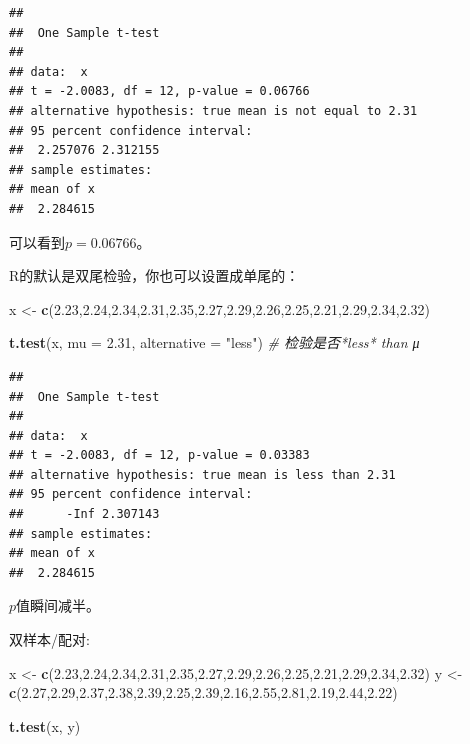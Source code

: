 \documentclass[]{book}
\newenvironment{Shaded}{\begin{snugshade}}{\end{snugshade}}
\newcommand{\CommentTok}[1]{\textcolor[rgb]{0.56,0.35,0.01}{\textit{#1}}}
\newcommand{\DataTypeTok}[1]{\textcolor[rgb]{0.13,0.29,0.53}{#1}}
\newcommand{\FloatTok}[1]{\textcolor[rgb]{0.00,0.00,0.81}{#1}}
\newcommand{\KeywordTok}[1]{\textcolor[rgb]{0.13,0.29,0.53}{\textbf{#1}}}
\newcommand{\NormalTok}[1]{#1}
\newcommand{\StringTok}[1]{\textcolor[rgb]{0.31,0.60,0.02}{#1}}
\begin{document}
\begin{verbatim}
## 
##  One Sample t-test
## 
## data:  x
## t = -2.0083, df = 12, p-value = 0.06766
## alternative hypothesis: true mean is not equal to 2.31
## 95 percent confidence interval:
##  2.257076 2.312155
## sample estimates:
## mean of x 
##  2.284615
\end{verbatim}

可以看到\(p=0.06766\)。

R的默认是双尾检验，你也可以设置成单尾的：

\begin{Shaded}
\begin{Highlighting}[]
\NormalTok{x <-}\StringTok{ }\KeywordTok{c}\NormalTok{(}\FloatTok{2.23}\NormalTok{,}\FloatTok{2.24}\NormalTok{,}\FloatTok{2.34}\NormalTok{,}\FloatTok{2.31}\NormalTok{,}\FloatTok{2.35}\NormalTok{,}\FloatTok{2.27}\NormalTok{,}\FloatTok{2.29}\NormalTok{,}\FloatTok{2.26}\NormalTok{,}\FloatTok{2.25}\NormalTok{,}\FloatTok{2.21}\NormalTok{,}\FloatTok{2.29}\NormalTok{,}\FloatTok{2.34}\NormalTok{,}\FloatTok{2.32}\NormalTok{)}

\KeywordTok{t.test}\NormalTok{(x, }\DataTypeTok{mu =} \FloatTok{2.31}\NormalTok{, }\DataTypeTok{alternative =} \StringTok{"less"}\NormalTok{) }\CommentTok{# 检验是否*less* than μ}
\end{Highlighting}
\end{Shaded}

\begin{verbatim}
## 
##  One Sample t-test
## 
## data:  x
## t = -2.0083, df = 12, p-value = 0.03383
## alternative hypothesis: true mean is less than 2.31
## 95 percent confidence interval:
##      -Inf 2.307143
## sample estimates:
## mean of x 
##  2.284615
\end{verbatim}

\(p\)值瞬间减半。

双样本/配对:

\begin{Shaded}
\begin{Highlighting}[]
\NormalTok{x <-}\StringTok{ }\KeywordTok{c}\NormalTok{(}\FloatTok{2.23}\NormalTok{,}\FloatTok{2.24}\NormalTok{,}\FloatTok{2.34}\NormalTok{,}\FloatTok{2.31}\NormalTok{,}\FloatTok{2.35}\NormalTok{,}\FloatTok{2.27}\NormalTok{,}\FloatTok{2.29}\NormalTok{,}\FloatTok{2.26}\NormalTok{,}\FloatTok{2.25}\NormalTok{,}\FloatTok{2.21}\NormalTok{,}\FloatTok{2.29}\NormalTok{,}\FloatTok{2.34}\NormalTok{,}\FloatTok{2.32}\NormalTok{)}
\NormalTok{y <-}\StringTok{ }\KeywordTok{c}\NormalTok{(}\FloatTok{2.27}\NormalTok{,}\FloatTok{2.29}\NormalTok{,}\FloatTok{2.37}\NormalTok{,}\FloatTok{2.38}\NormalTok{,}\FloatTok{2.39}\NormalTok{,}\FloatTok{2.25}\NormalTok{,}\FloatTok{2.39}\NormalTok{,}\FloatTok{2.16}\NormalTok{,}\FloatTok{2.55}\NormalTok{,}\FloatTok{2.81}\NormalTok{,}\FloatTok{2.19}\NormalTok{,}\FloatTok{2.44}\NormalTok{,}\FloatTok{2.22}\NormalTok{)}

\KeywordTok{t.test}\NormalTok{(x, y)}
\end{Highlighting}
\end{Shaded}
\end{document}
